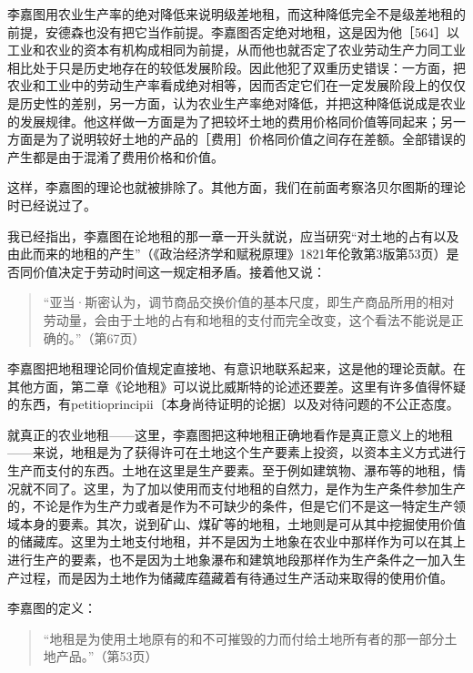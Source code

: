 李嘉图用农业生产率的绝对降低来说明级差地租，而这种降低完全不是级差地租的前提，安德森也没有把它当作前提。李嘉图否定绝对地租，这是因为他［564］以工业和农业的资本有机构成相同为前提，从而他也就否定了农业劳动生产力同工业相比处于只是历史地存在的较低发展阶段。因此他犯了双重历史错误：一方面，把农业和工业中的劳动生产率看成绝对相等，因而否定它们在一定发展阶段上的仅仅是历史性的差别，另一方面，认为农业生产率绝对降低，并把这种降低说成是农业的发展规律。他这样做一方面是为了把较坏土地的费用价格同价值等同起来；另一方面是为了说明较好土地的产品的［费用］价格同价值之间存在差额。全部错误的产生都是由于混淆了费用价格和价值。

这样，李嘉图的理论也就被排除了。其他方面，我们在前面考察洛贝尔图斯的理论时已经说过了。


我已经指出，李嘉图在论地租的那一章一开头就说，应当研究“对土地的占有以及由此而来的地租的产生”（《政治经济学和赋税原理》1821年伦敦第3版第53页）是否同价值决定于劳动时间这一规定相矛盾。接着他又说：

\begin{quote}{“亚当·斯密认为，调节商品交换价值的基本尺度，即生产商品所用的相对劳动量，会由于土地的占有和地租的支付而完全改变，这个看法不能说是正确的。”（第67页）}\end{quote}

李嘉图把地租理论同价值规定直接地、有意识地联系起来，这是他的理论贡献。在其他方面，第二章《论地租》可以说比威斯特的论述还要差。这里有许多值得怀疑的东西，有petitioprincipii〔本身尚待证明的论据〕以及对待问题的不公正态度。

就真正的农业地租——这里，李嘉图把这种地租正确地看作是真正意义上的地租——来说，地租是为了获得许可在土地这个生产要素上投资，以资本主义方式进行生产而支付的东西。土地在这里是生产要素。至于例如建筑物、瀑布等的地租，情况就不同了。这里，为了加以使用而支付地租的自然力，是作为生产条件参加生产的，不论是作为生产力或者是作为不可缺少的条件，但是它们不是这一特定生产领域本身的要素。其次，说到矿山、煤矿等的地租，土地则是可从其中挖掘使用价值的储藏库。这里为土地支付地租，并不是因为土地象在农业中那样作为可以在其上进行生产的要素，也不是因为土地象瀑布和建筑地段那样作为生产条件之一加入生产过程，而是因为土地作为储藏库蕴藏着有待通过生产活动来取得的使用价值。

李嘉图的定义：

\begin{quote}{“地租是为使用土地原有的和不可摧毁的力而付给土地所有者的那一部分土地产品。”（第53页）}\end{quote}

